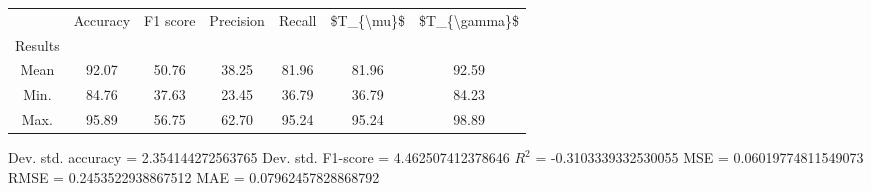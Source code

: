 \begin{tabular}{|c|c|c|c|c|c|c|}
\toprule
{} &  Accuracy &  F1 score &  Precision &  Recall &  \$T\_\{\textbackslash mu\}\$ &  \$T\_\{\textbackslash gamma\}\$ \\
Results &           &           &            &         &            &               \\
\hline
Mean    &     92.07 &     50.76 &      38.25 &   81.96 &      81.96 &         92.59 \\
Min.    &     84.76 &     37.63 &      23.45 &   36.79 &      36.79 &         84.23 \\
Max.    &     95.89 &     56.75 &      62.70 &   95.24 &      95.24 &         98.89 \\
\bottomrule
\end{tabular}

 Dev. std. accuracy = 2.354144272563765
 Dev. std. F1-score = 4.462507412378646
 $R^2$ = -0.3103339332530055
 MSE = 0.06019774811549073
 RMSE = 0.2453522938867512
 MAE = 0.07962457828868792